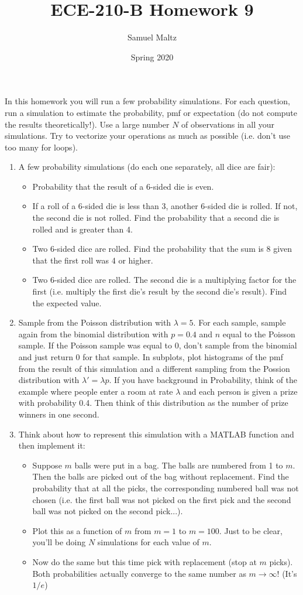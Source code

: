\documentclass[12pt]{article}
\title{ECE-210-B Homework 9}
\author{Samuel Maltz}
\date{Spring 2020}
\begin{document}
\noindent In this homework you will run a few probability simulations. For each question, run a simulation to estimate the probability, pmf or expectation (do not compute the results theoretically!). Use a large number $N$ of observations in all your simulations. Try to vectorize your operations as much as possible (i.e. don't use too many for loops).
\begin{enumerate}
\item A few probability simulations (do each one separately, all dice are fair):
\begin{itemize}
\item Probability that the result of a 6-sided die is even.
\item If a roll of a 6-sided die is less than 3, another 6-sided die is rolled. If not, the second die is not rolled. Find the probability that a second die is rolled and is greater than 4.
\item Two 6-sided dice are rolled. Find the probability that the sum is 8 given that the first roll was 4 or higher.
\item Two 6-sided dice are rolled. The second die is a multiplying factor for the first (i.e. multiply the first die's result by the second die's result). Find the expected value.
\end{itemize}
\item Sample from the Poisson distribution with $\lambda = 5$. For each sample, sample again from the binomial distribution with $p = 0.4$ and $n$ equal to the Poisson sample. If the Poisson sample was equal to 0, don't sample from the binomial and just return 0 for that sample. In subplots, plot histograms of the pmf from the result of this simulation and a different sampling from the Possion distribution with $\lambda' = \lambda p$. If you have background in Probability, think of the example where people enter a room at rate $\lambda$ and each person is given a prize with probability 0.4. Then think of this distribution as the number of prize winners in one second.
\item Think about how to represent this simulation with a MATLAB function and then implement it:
\begin{itemize}
\item Suppose $m$ balls were put in a bag. The balls are numbered from 1 to $m$. Then the balls are picked out of the bag without replacement. Find the probability that at all the picks, the corresponding numbered ball was not chosen (i.e. the first ball was not picked on the first pick and the second ball was not picked on the second pick...). 
\item Plot this as a function of $m$ from $m = 1$ to $m = 100$. Just to be clear, you'll be doing $N$ simulations for each value of $m$. 
\item Now do the same but this time pick with replacement (stop at $m$ picks). Both probabilities actually converge to the same number as $m \rightarrow \infty$! (It's $1/e$)
\end{itemize}
\end{enumerate}
\end{document}
